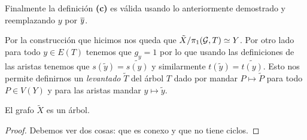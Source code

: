 \documentclass[tesis.tex]{subfiles}
\newcommand{\cG}{ {\cal G} }
\newcommand{\Xm}{\widetilde X}
\begin{document}
Finalmente la definición \textbf{(c)} es válida usando lo anteriormente demostrado y reemplazando $y$ por $\overline y$.

\medskip

Por la construcción que hicimos nos queda que $\tilde X / \pi_1(\cG, T) \simeq Y$.
Por otro lado para todo $y \in E(T)$ tenemos que $g_y=1$ por lo que usando las definiciones de las aristas tenemos que $s(\tilde y) = \widetilde{s(y)}$ y similarmente $t(\tilde y) = \widetilde{t(y)}$.
Esto nos permite definirnos un \emph{levantado} $\widetilde{T}$ del árbol $T$ dado por mandar $P \mapsto \tilde P$ para todo $P \in V(Y)$ y para las aristas mandar $y \mapsto \tilde y$. 

\begin{teo}[Serre]
	El grafo $\Xm$ es un árbol.
\end{teo}
\begin{proof}
	Debemos ver dos cosas: que es conexo y que no tiene ciclos.
	

\end{proof}
\end{document}
